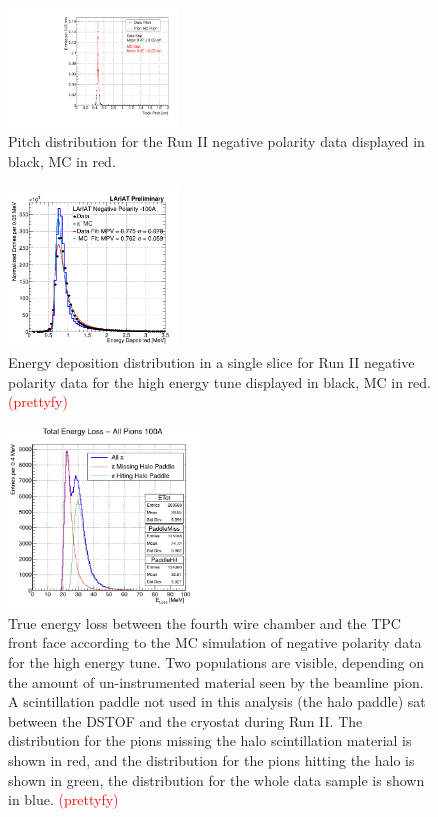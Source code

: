 \documentclass[aps,prl,twocolumn,showpacs,superscriptaddress,groupedaddress]{revtex4}  %
\begin{document}
\begin{figure}
\includegraphics[width =0.4\textwidth ]{PitchPi}
\caption{\label{fig:pitch}  Pitch distribution for the Run II negative polarity data displayed in black, MC in red.}
\end{figure}
\begin{figure}
\includegraphics[width =0.4\textwidth ]{DepEnergy_Fit_v4100A.png}
\caption{\label{fig:enDep}  Energy deposition distribution in a single slice for Run II negative polarity data for the high energy tune displayed in black, MC in red. \textcolor{red}{(prettyfy)}}
\end{figure}

\begin{figure}
\centering
\includegraphics[width=0.45\textwidth]{E_loss100A.png}
\caption{\label{fig:ELoss100A}  True energy loss between the fourth wire chamber and the TPC front face according to the MC simulation of negative polarity data for the high energy tune. Two populations are visible, depending on the amount of un-instrumented material seen by the beamline pion. A scintillation paddle not used in this analysis (the halo paddle) sat between the DSTOF and the cryostat during Run II. The distribution for the pions missing the halo scintillation material is shown in red, and the distribution for the pions hitting the halo is shown in green, the distribution for the whole data sample is shown in blue. \textcolor{red}{(prettyfy)} }
\end{figure}
\end{document}
